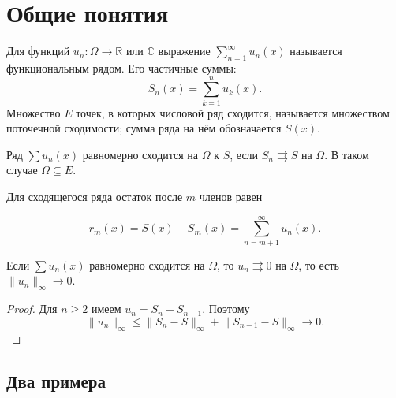 \section{Общие понятия}\label{sec-series-01}

\begin{definition}\label{def-functional-series}

Для функций \(u_n:\Omega\to\mathbb R\) или \(\mathbb C\) выражение \(\sum_{n=1}^\infty u_n(x)\) называется функциональным рядом. Его частичные суммы: \[
S_n(x)=\sum_{k=1}^n u_k(x).
\] Множество \(E\) точек, в которых числовой ряд сходится, называется множеством поточечной сходимости; сумма ряда на нём обозначается \(S(x)\).

\end{definition}

\begin{definition}\label{def-uniform-series}

Ряд \(\sum u_n(x)\) равномерно сходится на \(\Omega\) к \(S\), если \(S_n\rightrightarrows S\) на \(\Omega\). В таком случае \(\Omega\subseteq E\).

Для сходящегося ряда остаток после \(m\) членов равен

\begin{equation}
r_m(x)=S(x)-S_m(x)=\sum_{n=m+1}^\infty u_n(x).
\label{eq-series-remainder}
\end{equation}

\end{definition}

\begin{theorem}\label{thm-series-necessary}

Если \(\sum u_n(x)\) равномерно сходится на \(\Omega\), то \(u_n\rightrightarrows0\) на \(\Omega\), то есть \(\lVert u_n\rVert_\infty\to0\).

\end{theorem}

\begin{proof}

Для \(n\ge2\) имеем \(u_n=S_n-S_{n-1}\). Поэтому \[
\lVert u_n\rVert_\infty\le\lVert S_n-S\rVert_\infty+\lVert S_{n-1}-S\rVert_\infty\longrightarrow0.
\]

\end{proof}

\subsection{Два примера}\label{sec-series-01-1}

